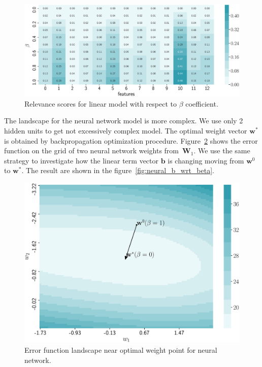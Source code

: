 \documentclass[a4paper,12pt]{article}
\theoremstyle{plain} %
\theoremstyle{definition} %
\theoremstyle{remark} %
\newcommand{\bb}{\mathbf{b}}
\newcommand{\bw}{\mathbf{w}}
\newcommand{\bW}{\mathbf{W}}
\begin{document}
	\begin{figure}[!h]	
		\centering
		\includegraphics[width=\linewidth]{figs/linear_b_wrt_beta.eps}	 
		\caption{Relevance scores for linear model with respect to $\beta$ coefficient.}
		\label{fig:linear_b_wrt_beta}
	\end{figure}

	The landscape for the neural network model is more complex. We use only 2 hidden units to get not excessively complex model. The optimal weight vector $\bw^*$ is obtained by backpropagation optimization procedure. Figure~\ref{fig:neural_error} shows the error function on the grid of two neural network weights from~$\bW_1$. We use the same strategy to investigate how the linear term vector $\bb$ is changing moving from $\bw^0$ to $\bw^*$. The result are shown in the figure~\ref{fig:neural_b_wrt_beta}.
	

	\begin{figure}[!h]	
		\centering
		\includegraphics[width=0.8\linewidth]{figs/neural_error.eps}	 
		\caption{Error function landscape near optimal weight point for neural network.}
		\label{fig:neural_error}
	\end{figure}
	
\end{document}
